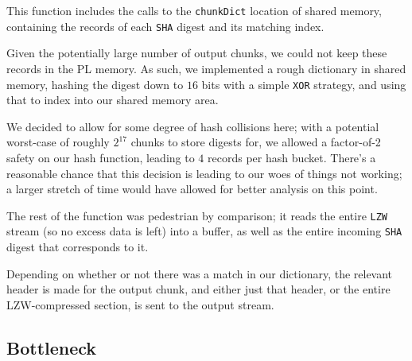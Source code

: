 \documentclass{article}
\begin{document}
This function includes the calls to the \texttt{chunkDict} location of shared memory, containing the records of each \texttt{SHA} digest and its matching index.
\newline\par
Given the potentially large number of output chunks, we could not keep these records in the PL memory. 
As such, we implemented a rough dictionary in shared memory, hashing the digest down to $16$ bits with a simple \texttt{XOR} strategy,
and using that to index into our shared memory area.
\par
We decided to allow for some degree of hash collisions here; with a potential worst-case of roughly $2^{17}$ chunks to store digests for,
we allowed a factor-of-2 safety on our hash function, leading to $4$ records per hash bucket. 
There's a reasonable chance that this decision
is leading to our woes of things not working; a larger stretch of time would have allowed for better analysis on this point.

\newline\par
The rest of the function was pedestrian by comparison; it reads the entire \texttt{LZW} stream (so no excess data is left) into a buffer,
as well as the entire incoming \texttt{SHA} digest that corresponds to it.
\par
Depending on whether or not there was a match in our dictionary, the relevant header is made for the output chunk,
and either just that header, or the entire LZW-compressed section, is sent to the output stream.


\subsection{Bottleneck}
\end{document}
